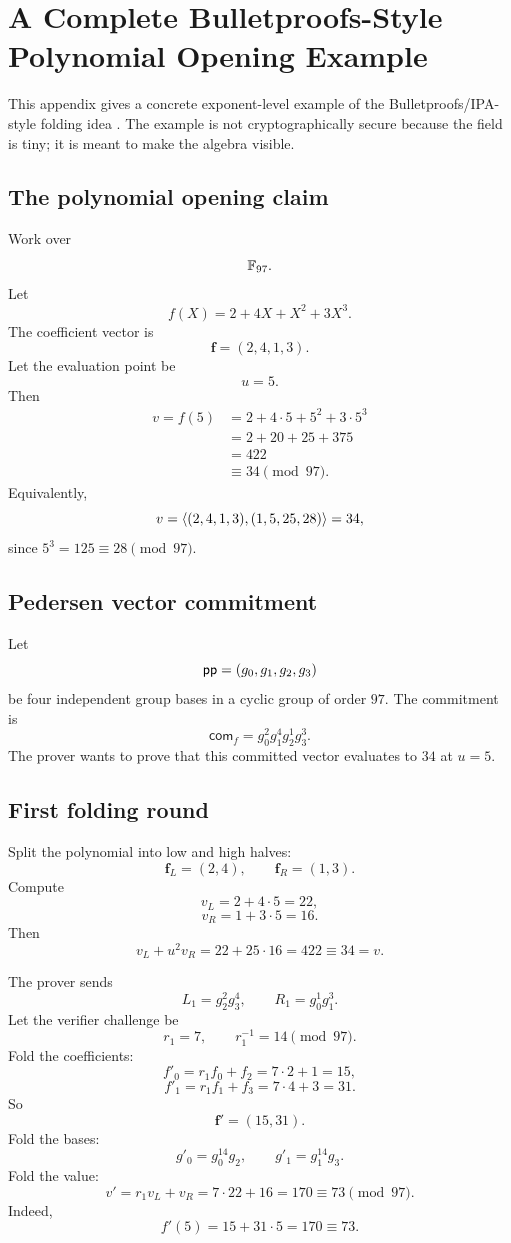 ﻿\section{A Complete Bulletproofs-Style Polynomial Opening Example}

This appendix gives a concrete exponent-level example of the Bulletproofs/IPA-style folding idea \cite{Bulletproofs2018}. The example is not cryptographically secure because the field is tiny; it is meant to make the algebra visible.

\subsection{The polynomial opening claim}

Work over
\[
    \mathbb{F}_{97}.
\]
Let
\[
    f(X)=2+4X+X^2+3X^3.
\]
The coefficient vector is
\[
    \mathbf f=(2,4,1,3).
\]
Let the evaluation point be
\[
    u=5.
\]
Then
\[
\begin{aligned}
    v=f(5)
    &=2+4\cdot 5+5^2+3\cdot 5^3\\
    &=2+20+25+375\\
    &=422\\
    &\equiv 34\pmod{97}.
\end{aligned}
\]
Equivalently,
\[
    v=\left\langle (2,4,1,3),(1,5,25,28)\right\rangle=34,
\]
since $5^3=125\equiv 28\pmod{97}$.

\subsection{Pedersen vector commitment}

Let
\[
    \mathsf{pp}=(g_0,g_1,g_2,g_3)
\]
be four independent group bases in a cyclic group of order $97$. The commitment is
\[
    \mathsf{com}_f=g_0^2g_1^4g_2^1g_3^3.
\]
The prover wants to prove that this committed vector evaluates to $34$ at $u=5$.

\subsection{First folding round}

Split the polynomial into low and high halves:
\[
    \mathbf f_L=(2,4),
    \qquad
    \mathbf f_R=(1,3).
\]
Compute
\[
    v_L=2+4\cdot 5=22,
\]
\[
    v_R=1+3\cdot 5=16.
\]
Then
\[
    v_L+u^2v_R=22+25\cdot 16=422\equiv 34=v.
\]

The prover sends
\[
    L_1=g_2^2g_3^4,
    \qquad
    R_1=g_0^1g_1^3.
\]
Let the verifier challenge be
\[
    r_1=7,
    \qquad
    r_1^{-1}=14\pmod{97}.
\]
Fold the coefficients:
\[
    f'_0=r_1f_0+f_2=7\cdot 2+1=15,
\]
\[
    f'_1=r_1f_1+f_3=7\cdot 4+3=31.
\]
So
\[
    \mathbf f'=(15,31).
\]
Fold the bases:
\[
    g'_0=g_0^{14}g_2,
    \qquad
    g'_1=g_1^{14}g_3.
\]
Fold the value:
\[
    v'=r_1v_L+v_R=7\cdot22+16=170\equiv 73\pmod{97}.
\]
Indeed,
\[
    f'(5)=15+31\cdot5=170\equiv 73.
\]


